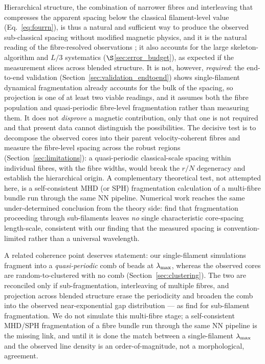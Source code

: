 \documentclass[usenatbib,twoside,twocolumn]{mnras}
\begin{document}
Hierarchical structure, the combination of narrower fibres and interleaving that compresses the apparent spacing below the classical filament-level value (Eq.~\ref{eq:fourrn}), is thus a natural and sufficient way to produce the observed sub-classical spacing without modified magnetic physics, and it is the natural reading of the fibre-resolved observations \citep{Yang2024,Hacar2013}; it also accounts for the large skeleton-algorithm and $L/3$ systematics ($\S$\ref{sec:error_budget}), as expected if the measurement slices across blended structure. It is not, however, \emph{required}: the end-to-end validation (Section~\ref{sec:validation_endtoend}) shows single-filament dynamical fragmentation already accounts for the bulk of the spacing, so projection is one of at least two viable readings, and it assumes both the fibre population and quasi-periodic fibre-level fragmentation rather than measuring them. It does not \emph{disprove} a magnetic contribution, only that one is not required and that present data cannot distinguish the possibilities. The decisive test is to decompose the observed cores into their parent velocity-coherent fibres and measure the fibre-level spacing across the robust regions (Section~\ref{sec:limitations}): a quasi-periodic classical-scale spacing within individual fibres, with the fibre widths, would break the $r/N$ degeneracy and establish the hierarchical origin. A complementary theoretical test, not attempted here, is a self-consistent MHD (or SPH) fragmentation calculation of a multi-fibre bundle run through the same NN pipeline. Numerical work reaches the same under-determined conclusion from the theory side: \citet{Clarke2020} find that fragmentation proceeding through sub-filaments leaves \emph{no} single characteristic core-spacing length-scale, consistent with our finding that the measured spacing is convention-limited rather than a universal wavelength.

A related coherence point deserves statement: our single-filament simulations fragment into a \emph{quasi-periodic} comb of beads at $\lambda_{\rm max}$, whereas the observed cores are random-to-clustered with no comb (Section~\ref{sec:clustering}). The two are reconciled only if sub-fragmentation, interleaving of multiple fibres, and projection across blended structure erase the periodicity and broaden the comb into the observed near-exponential gap distribution --- as \citet{Clarke2020} find for sub-filament fragmentation. We do not simulate this multi-fibre stage; a self-consistent MHD/SPH fragmentation of a fibre bundle run through the same NN pipeline is the missing link, and until it is done the match between a single-filament $\lambda_{\rm max}$ and the observed line density is an order-of-magnitude, not a morphological, agreement.
\end{document}
